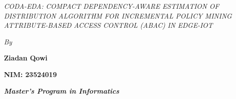 \endgroup


\begingroup


\setlength{\parindent}{0pt}
\setlength{\parskip}{0pt}



\vspace{14.4pt}


%

{\centering
\normalfont
\bfseries
\itshape
\fontsize{14pt}{16.8pt}\selectfont

\textit{CODA-EDA: COMPACT DEPENDENCY-AWARE ESTIMATION OF DISTRIBUTION ALGORITHM FOR INCREMENTAL POLICY MINING ATTRIBUTE-BASED ACCESS CONTROL (ABAC) IN EDGE-IOT}
\par
}



\vspace{14.4pt}


%

{\centering
\normalfont
\fontsize{12pt}{14.4pt}\selectfont

\textit{By}\par

\textbf{Ziadan Qowi}\par
\textbf{NIM: 23524019}\par
\textbf{\textit{Master's Program in Informatics}}\par

}


%

\vspace{43.2pt}

